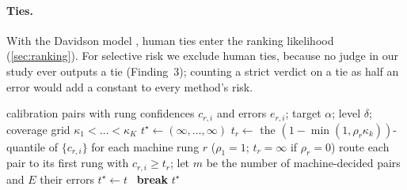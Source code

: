 \paragraph{Ties.}
With the Davidson model \citep{davidson1970extending}, human ties enter the ranking likelihood (\cref{sec:ranking}). For selective risk we exclude human ties, because no judge in our study ever outputs a tie (Finding~3); counting a strict verdict on a tie as half an error would add a constant to every method's risk.

\begin{algorithm}[t]
\caption{\eaglev{} calibration for one path $\rho$ (run for every $\rho\in\mathcal F$ at level $\delta/|\mathcal F|$; deploy the cheapest certified result)}\label{alg:cal}
\begin{algorithmic}[1]
\Require calibration pairs with rung confidences $c_{r,i}$ and errors $e_{r,i}$; target $\alpha$; level $\delta$; coverage grid $\kappa_1<\dots<\kappa_K$
\State $t^\star\gets(\infty,\dots,\infty)$ 
  \State $t_r\gets$ the $(1-\min(1,\rho_r\kappa_k))$-quantile of $\{c_{r,i}\}$ for each machine rung $r$ ($\rho_1=1$; $t_r=\infty$ if $\rho_r=0$)
  \State route each pair to its first rung with $c_{r,i}\ge t_r$; let $m$ be the number of machine-decided pairs and $E$ their errors
   \State $t^\star\gets t$ \Else\ \textbf{break} \EndIf
\EndFor
\State \Return $t^\star$
\end{algorithmic}
\end{algorithm}
